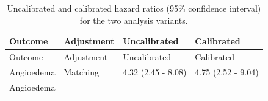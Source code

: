\documentclass[11pt]{book}
\begin{document}
\begin{longtable}[]{@{}llll@{}}
\caption{\label{tab:sensAnalysis} Uncalibrated and calibrated hazard ratios
(95\% confidence interval) for the two analysis
variants.}\tabularnewline
\toprule
\begin{minipage}[b]{0.27\columnwidth}\raggedright\strut
Outcome\strut
\end{minipage} & \begin{minipage}[b]{0.15\columnwidth}\raggedright\strut
Adjustment\strut
\end{minipage} & \begin{minipage}[b]{0.17\columnwidth}\raggedright\strut
Uncalibrated\strut
\end{minipage} & \begin{minipage}[b]{0.17\columnwidth}\raggedright\strut
Calibrated\strut
\end{minipage}\tabularnewline
\midrule
\endfirsthead
\toprule
\begin{minipage}[b]{0.27\columnwidth}\raggedright\strut
Outcome\strut
\end{minipage} & \begin{minipage}[b]{0.15\columnwidth}\raggedright\strut
Adjustment\strut
\end{minipage} & \begin{minipage}[b]{0.17\columnwidth}\raggedright\strut
Uncalibrated\strut
\end{minipage} & \begin{minipage}[b]{0.17\columnwidth}\raggedright\strut
Calibrated\strut
\end{minipage}\tabularnewline
\midrule
\endhead
\begin{minipage}[t]{0.27\columnwidth}\raggedright\strut
Angioedema\strut
\end{minipage} & \begin{minipage}[t]{0.15\columnwidth}\raggedright\strut
Matching\strut
\end{minipage} & \begin{minipage}[t]{0.17\columnwidth}\raggedright\strut
4.32 (2.45 - 8.08)\strut
\end{minipage} & \begin{minipage}[t]{0.17\columnwidth}\raggedright\strut
4.75 (2.52 - 9.04)\strut
\end{minipage}\tabularnewline
\begin{minipage}[t]{0.27\columnwidth}\raggedright\strut
Angioedema\strut
\end{minipage} & \begin{minipage}[t]{0.15\columnwidth}\raggedright\strut

\end{minipage}
\end{longtable}
\end{document}
